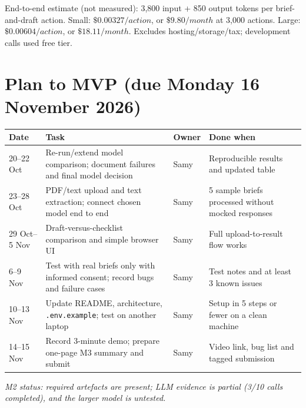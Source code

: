 \documentclass[8pt]{article}
\begin{document}
End-to-end estimate (not measured): 3,800 input + 850 output tokens per brief-and-draft action. Small: $\$0.00327/action$, or $\$9.80/month$ at 3,000 actions. Large: $\$0.00604/action$, or $\$18.11/month$. Excludes hosting/storage/tax; development calls used free tier.
\section{Plan to MVP (due Monday 16 November 2026)}
\footnotesize
\begin{tabular}{@{}p{1.8cm}p{8.0cm}p{1.45cm}p{3.9cm}@{}}
\toprule
\textbf{Date} & \textbf{Task} & \textbf{Owner} & \textbf{Done when}\\
\midrule
20--22 Oct & Re-run/extend model comparison; document failures and final model decision & Samy & Reproducible results and updated table\\
23--28 Oct & PDF/text upload and text extraction; connect chosen model end to end & Samy & 5 sample briefs processed without mocked responses\\
29 Oct--5 Nov & Draft-versus-checklist comparison and simple browser UI & Samy & Full upload-to-result flow works\\
6--9 Nov & Test with real briefs only with informed consent; record bugs and failure cases & Samy & Test notes and at least 3 known issues\\
10--13 Nov & Update README, architecture, \texttt{.env.example}; test on another laptop & Samy & Setup in 5 steps or fewer on a clean machine\\
14--15 Nov & Record 3-minute demo; prepare one-page M3 summary and submit & Samy & Video link, bug list and tagged submission\\
\bottomrule
\end{tabular}

\vfill\textit{M2 status: required artefacts are present; LLM evidence is partial (3/10 calls completed), and the larger model is untested.}
\end{document}
